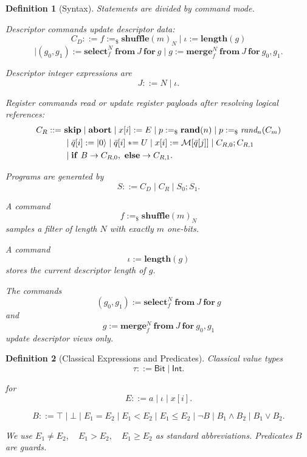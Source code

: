 \documentclass[acmsmall,screen,review,anonymous,nonacm]{acmart}
\newtheorem{definition}{Definition}[section]
\theoremstyle{defn_style}
\newcommand{\asteq}{\mathrel{*}=}
\begin{document}
    \begin{definition}[Syntax]
      Statements are divided by command mode.
      
      Descriptor commands update descriptor data:
      \[
      C_D ::=
      f :=_{\$}\mathbf{shuffle}(m)_N
      \mid
      \iota := \mathbf{length}(g)
      \]
      \[
      \mid
      (g_0,g_1)
      :=
      \mathbf{select}_{f}^{N}\ \mathbf{from}\ J\ \mathbf{for}\ g
      \mid
      g
      :=
      \mathbf{merge}_{f}^{N}\ \mathbf{from}\ J\ \mathbf{for}\ g_0,g_1 .
      \]
      
      Descriptor integer expressions are
      \[
      J ::= N \mid \iota .
      \]
      
      Register commands read or update register payloads after resolving logical
      references:
      \begin{align*}
      C_R ::=~&
      \mathbf{skip}
      \mid
      \mathbf{abort}
      \mid
      x[i] := E
      \mid
      p :=_{\$}\mathbf{rand}(n)
      \mid
      p :=_{\$} \textit{rand}_{n}(C_m)
      \\
      &\mid
      \bar q[i] := \ket{0}
      \mid
      \bar q[i] \asteq U
      \mid
      x[i] := \mathcal{M}[\bar q[j]]
      \mid
      C_{R,0};C_{R,1}
      \\
      &\mid
      \mathbf{if}\ B \rightarrow C_{R,0},\ \mathbf{else}\rightarrow C_{R,1} .
      \end{align*}
       
      Programs are generated by
      \[
      S ::=
      C_D
      \mid C_R
      \mid S_0;S_1 .
      \]
      
      A command
      \[
      f:=_{\$}\mathbf{shuffle}(m)_N
      \]
      samples a filter of length \(N\) with exactly \(m\) one-bits.
      
      A command
      \[
      \iota:=\mathbf{length}(g)
      \]
      stores the current descriptor length of \(g\).
      
      The commands
      \[
      (g_0,g_1)
      :=
      \mathbf{select}_{f}^{N}\ \mathbf{from}\ J\ \mathbf{for}\ g
      \]
      and
      \[
      g
      :=
      \mathbf{merge}_{f}^{N}\ \mathbf{from}\ J\ \mathbf{for}\ g_0,g_1
      \]
      update descriptor views only.
\end{definition}


\begin{definition}[Classical Expressions and Predicates]
Classical value types
\[
\tau ::= \mathsf{Bit}\mid \mathsf{Int}.
\]

for
\[
E ::=
a
\mid \iota
\mid x[i].
\]

\[
B ::=
\top
\mid \bot
\mid E_1=E_2
\mid E_1<E_2
\mid E_1\leq E_2
\mid \neg B
\mid B_1\land B_2
\mid B_1\lor B_2 .
\]

We use \(E_1\neq E_2,\quad E_1>E_2,\quad E_1\geq E_2\)
as standard abbreviations. Predicates \(B\) are guards.
\end{definition}
\end{document}
